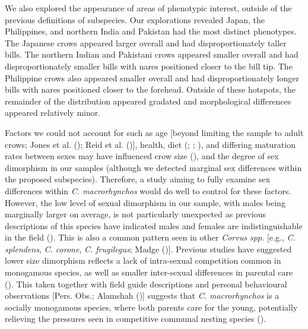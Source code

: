 \documentclass[10pt,a4paper]{article}
\begin{document}
We also explored the appearance of areas of phenotypic interest, outside of the previous definitions of subspecies.
Our explorations revealed Japan, the Philippines, and northern India and Pakistan had the most distinct phenotypes.
The Japanese crows appeared larger overall and had disproportionately taller bills.
The northern Indian and Pakistani crows appeared smaller overall and had disproportionately smaller bills with nares positioned closer to the bill tip.
The Philippine crows also appeared smaller overall and had disproportionately longer bills with nares positioned closer to the forehead.
Outside of these hotspots, the remainder of the distribution appeared gradated and morphological differences appeared relatively minor.

Factors we could not account for such as age {[}beyond limiting the sample to adult crows; Jones et al. (); Reid et al. (){]}, health, diet (; ; ), and differing maturation rates between sexes may have influenced crow size (), and the degree of sex dimorphism in our samples (although we detected marginal sex differences within the proposed subspecies).
Therefore, a study aiming to fully examine sex differences within \emph{C. macrorhynchos} would do well to control for these factors.
However, the low level of sexual dimorphism in our sample, with males being marginally larger on average, is not particularly unexpected as previous descriptions of this species have indicated males and females are indistinguishable in the field ().
This is also a common pattern seen in other \emph{Corvus spp.} {[}e.g., \emph{C. splendens}, \emph{C. corone}, \emph{C. frugilegus}; Madge (){]}.
Previous studies have suggested lower size dimorphism reflects a lack of intra-sexual competition common in monogamous species, as well as smaller inter-sexual differences in parental care ().
This taken together with field guide descriptions and personal behavioural observations {[}Pers. Obs.; Alamshah (){]} suggests that \emph{C. macrorhynchos} is a socially monogamous species, where both parents care for the young, potentially relieving the pressures seen in competitive communal nesting species ().
\end{document}
